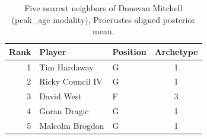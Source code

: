 \begin{table}[htbp]
  \centering\small
  \begin{tabular}{rllc}
    \toprule
    Rank & Player & Position & Archetype \\
    \midrule
    1 & Tim Hardaway & G & 1 \\
    2 & Ricky Council IV & G & 1 \\
    3 & David West & F & 3 \\
    4 & Goran Dragic & G & 1 \\
    5 & Malcolm Brogdon & G & 1 \\
    \bottomrule
  \end{tabular}
  \caption{Five nearest neighbors of Donovan Mitchell (peak_age modality), Procrustes-aligned posterior mean.}
  \label{tab:Donovan_Mitchell_neighbors_peak_age}
\end{table}

